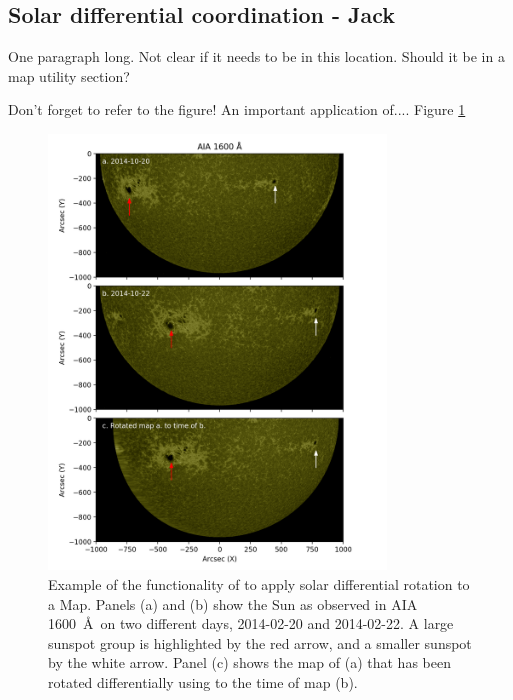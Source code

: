 \subsection{Solar differential coordination - Jack}
One paragraph long. 
Not clear if it needs to be in this location. 
Should it be in a map utility section?

Don't forget to refer to the figure!
An important application of....
Figure \ref{fig:diff_rot}


\begin{figure}
    \center
    \includegraphics[width = 0.8\textwidth]{figures/diff_rot_aia1600.png}
    \caption{Example of the functionality of \sunpy to apply solar differential rotation to a Map. 
    Panels (a) and (b) show the Sun as observed in AIA 1600~\AA\ on two different days, 2014-02-20 and 2014-02-22. 
    A large sunspot group is highlighted by the red arrow, and a smaller sunspot by the white arrow. 
    Panel (c) shows the map of (a) that has been rotated differentially using \sunpy to the time of map (b).}
    \label{fig:diff_rot}
\end{figure}